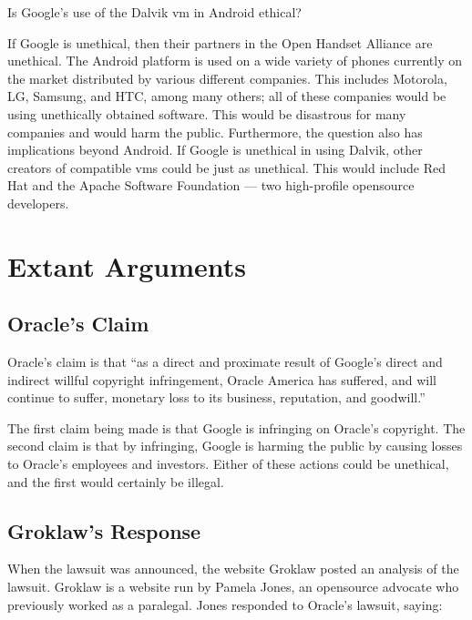 \documentclass[11pt]{article}
\begin{document}
\begin{multicols}{2}
Is Google's use of the Dalvik \gls{vm} in Android ethical?

If Google is unethical, then their partners in the Open Handset Alliance are
unethical.  The Android platform is used on a wide variety of phones currently
on the market distributed by various different companies.    This includes
Motorola, LG, Samsung, and HTC, among many others; all of these companies would
be using unethically obtained software.  This would be disastrous for many
companies and would harm the public.  Furthermore, the question also has
implications beyond Android.  If Google is unethical in using Dalvik, other
creators of compatible \glspl{vm} could be just as unethical.  This would
include Red Hat and the Apache Software Foundation --- two high-profile
\gls{opensource} developers.


\section{Extant Arguments} %
\label{sec:args}

\subsection{Oracle's Claim} %
\label{sub:args_oracle}

Oracle's claim is that ``as a direct and proximate result of Google's direct
and indirect willful copyright infringement, Oracle America has suffered, and
will continue to suffer, monetary loss to its business, reputation, and
goodwill.'' \cite[p.~9 line 11]{oracle-lawsuit}

The first claim being made is that Google is infringing on Oracle's copyright.
The second claim is that by infringing, Google is harming the public by causing
losses to Oracle's employees and investors.  Either of these actions could be
unethical, and the first would certainly be illegal.


\subsection{Groklaw's Response} %
\label{sub:args_groklaw}

When the lawsuit was announced, the website Groklaw posted an analysis of the
lawsuit.  Groklaw is a website run by Pamela Jones, an \gls{opensource} advocate
who previously worked as a paralegal. \cite{groklaw-pj} Jones responded to
Oracle's lawsuit, saying: \cite{groklaw}


\end{multicols}
\end{document}
